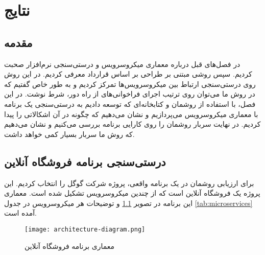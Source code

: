 \chapter{نتایج}
\label{chap:results}
\section{مقدمه} 
در فصل‌های قبل درباره معماری میکروسرویس و درستی‌سنجی نرم‌افزار صحبت کردیم. سپس روشی مبتنی بر طراحی بر اساس قرارداد معرفی کردیم. در این روش روی درستی‌سنجی ارتباط بین میکروسرویس‌ها تمرکز کردیم و به طور خاص گفتیم که در روش ما می‌توان روی ترتیب اجرای فراخوانی‌های از راه دور، شرط نوشت. در این فصل،‌ با استفاده از روشمان و کتابخانه‌ای که توسعه دادیم به درستی‌سنجی یک برنامه با معماری میکروسرویس می‌پردازیم و نشان می‌دهیم که چگونه در آن اشکالاتی را پیدا کردیم. در نهایت سربار روشمان را روی کارایی برنامه بررسی می‌کنیم و نشان می‌دهیم که روش ما سربار بسیار کمی خواهد داشت.

\section{درستی‌سنجی برنامه فروشگاه آنلاین}
برای ارزیابی روشمان در یک برنامه واقعی، پروژه
 \cite{microservicesDemo}
شرکت گوگل را انتخاب کردیم. این پروژه یک فروشگاه آنلاین است که از چندین میکروسرویس تشکیل شده است. معماری این برنامه در تصویر
\ref{fig:arch}
و توضیحات هر میکروسرویس در جدول
\ref{tab:microservices}
آمده است.

\begin{figure}[ht]
\centerline{\texttt{[image: architecture-diagram.png]}}
\caption{معماری برنامه فروشگاه آنلاین}
\label{fig:arch}
\end{figure}

